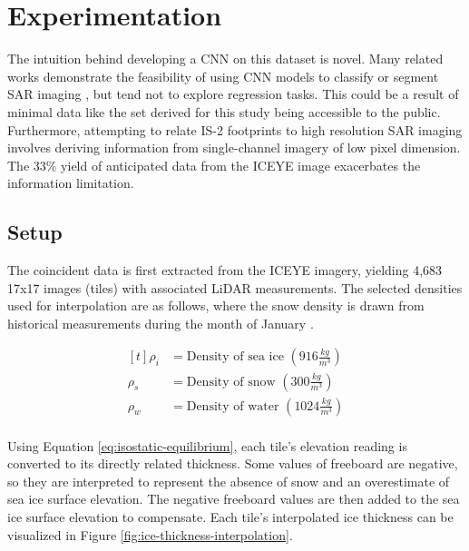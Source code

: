 \chapter{Experimentation}
\label{sec:Experimentation}

The intuition behind developing a CNN on this dataset is novel. Many related works demonstrate the feasibility of using CNN models to classify or segment SAR imaging \cite{SAR-U-Net}, but tend not to explore regression tasks. This could be a result of minimal data like the set derived for this study being accessible to the public. Furthermore, attempting to relate IS-2 footprints to high resolution SAR imaging involves deriving information from single-channel imagery of low pixel dimension. The 33$\%$ yield of anticipated data from the ICEYE image exacerbates the information limitation. 

\section{Setup}
The coincident data is first extracted from the ICEYE imagery, yielding 4,683 17x17 images (tiles) with associated LiDAR measurements. The selected densities used for interpolation are as follows, where the snow density is drawn from historical measurements during the month of January \cite{warren1999snow}.

\begin{figure}[h!]
  \[
  \begin{aligned}[t]
    \rho_i &=  \text{Density of sea ice }(916 \frac{kg}{m^3}) \\   %
    \rho_s &=  \text{Density of snow }(300 \frac{kg}{m^3}) \\   %
    \rho_w &=  \text{Density of water }(1024 \frac{kg}{m^3}) \\   %
  \end{aligned}
\]
\end{figure}
  
Using Equation \ref{eq:isostatic-equilibrium}, each tile's elevation reading is converted to its directly related thickness. Some values of freeboard are negative, so they are interpreted to represent the absence of snow and an overestimate of sea ice surface elevation. The negative freeboard values are then added to the sea ice surface elevation to compensate. Each tile's interpolated ice thickness can be visualized in Figure \ref{fig:ice-thickness-interpolation}.

